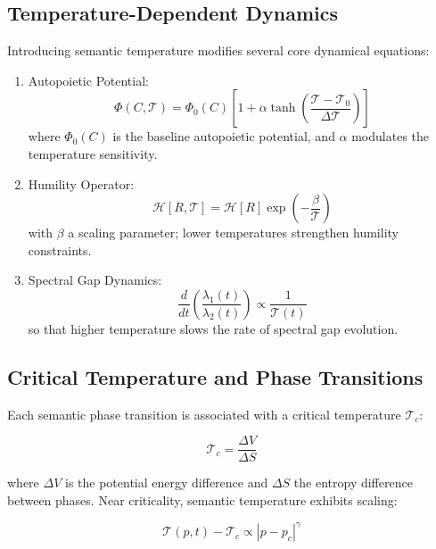 \subsection{Temperature-Dependent Dynamics}

Introducing semantic temperature modifies several core dynamical equations:

\begin{enumerate}
    \item Autopoietic Potential:
    \begin{equation}
    \Phi(C, \mathcal{T}) = \Phi_0(C) \left[1 + \alpha \tanh\left(\frac{\mathcal{T} - \mathcal{T}_0}{\Delta \mathcal{T}}\right)\right]
    \end{equation}
    where \(\Phi_0(C)\) is the baseline autopoietic potential, and \(\alpha\) modulates the temperature sensitivity.

    \item Humility Operator:
    \begin{equation}
    \mathcal{H}[R, \mathcal{T}] = \mathcal{H}[R] \exp\left(-\frac{\beta}{\mathcal{T}}\right)
    \end{equation}
    with \(\beta\) a scaling parameter; lower temperatures strengthen humility constraints.

    \item Spectral Gap Dynamics:
    \begin{equation}
    \frac{d}{dt}\left(\frac{\lambda_1(t)}{\lambda_2(t)}\right) \propto \frac{1}{\mathcal{T}(t)}
    \end{equation}
    so that higher temperature slows the rate of spectral gap evolution.
\end{enumerate}

\subsection{Critical Temperature and Phase Transitions}

Each semantic phase transition is associated with a critical temperature \(\mathcal{T}_c\):

\begin{equation}
\mathcal{T}_c = \frac{\Delta V}{\Delta S}
\end{equation}

where \(\Delta V\) is the potential energy difference and \(\Delta S\) the entropy difference between phases. Near criticality, semantic temperature exhibits scaling:

\begin{equation}
\mathcal{T}(p,t) - \mathcal{T}_c \propto |p - p_c|^{\gamma}
\end{equation}

